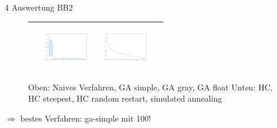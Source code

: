 \documentclass{ocbeameruni}
\begin{document}
\begin{frame}{4 Auswertung BB2}
\begin{center}
\begin{figure}
\begin{tabular}{|c|c|c|c|}
    & \includegraphics[width=23mm, height=20mm]{plots/bb2_hc_rs.png}
    & \includegraphics[width=23mm, height=20mm]{plots/bb2_sa.png} \\ \hline
    \end{tabular}
    \caption{Oben: Naives Verfahren, GA simple, GA gray, GA float \hspace{\textwidth}Unten: HC, HC steepest, HC random restart, simulated annealing}
    \end{figure}
    $\Rightarrow$ bestes Verfahren: ga-simple mit 100!
    \end{center}
\end{frame}
\end{document}
